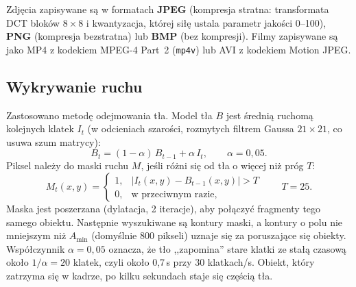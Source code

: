 Zdjęcia zapisywane są w formatach \textbf{JPEG} (kompresja stratna: transformata DCT bloków
$8\times8$ i kwantyzacja, której siłę ustala parametr jakości 0--100), \textbf{PNG} (kompresja
bezstratna) lub \textbf{BMP} (bez kompresji). Filmy zapisywane są jako MP4 z kodekiem MPEG-4 Part~2
(\texttt{mp4v}) lub AVI z kodekiem Motion JPEG.

\subsection{Wykrywanie ruchu}
Zastosowano metodę odejmowania tła. Model tła $B$ jest średnią ruchomą kolejnych klatek $I_t$
(w odcieniach szarości, rozmytych filtrem Gaussa $21\times21$, co usuwa szum matrycy):
\begin{equation}
  B_t = (1 - \alpha)\, B_{t-1} + \alpha\, I_t, \qquad \alpha = 0{,}05.
\end{equation}
Piksel należy do maski ruchu $M$, jeśli różni się od tła o więcej niż próg $T$:
\begin{equation}
  M_t(x,y) = \begin{cases} 1, & |I_t(x,y) - B_{t-1}(x,y)| > T \\ 0, & \text{w przeciwnym razie,} \end{cases}
  \qquad T = 25.
\end{equation}
Maska jest poszerzana (dylatacja, 2 iteracje), aby połączyć fragmenty tego samego obiektu. Następnie
wyszukiwane są kontury maski, a kontury o polu nie mniejszym niż $A_{\min}$ (domyślnie 800 pikseli)
uznaje się za poruszające się obiekty. Współczynnik $\alpha = 0{,}05$ oznacza, że tło ,,zapomina''
stare klatki ze stałą czasową około $1/\alpha = 20$ klatek, czyli około 0,7\,s przy 30 klatkach/s.
Obiekt, który zatrzyma się w kadrze, po kilku sekundach staje się częścią tła.

